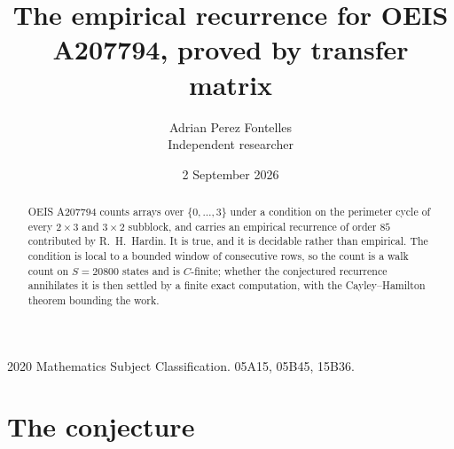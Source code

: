 \documentclass[11pt,a4paper]{article}
\title{The empirical recurrence for OEIS A207794, proved by transfer matrix}
\author{Adrian Perez Fontelles\\ \small Independent researcher}
\date{2 September 2026}
\theoremstyle{plain}
\theoremstyle{definition}
\begin{document}
\maketitle

\begin{abstract}
OEIS A207794 counts arrays over $\{0,\dots,3\}$ under a condition on the perimeter cycle of
every $2\times3$ and $3\times2$ subblock, and carries an empirical recurrence of order $85$ contributed by
R.~H.~Hardin. It is true, and it is decidable rather than empirical. The condition is local to
a bounded window of consecutive rows, so the count is a walk count on $S=20800$ states and is
$C$-finite; whether the conjectured recurrence annihilates it is then settled by a finite exact
computation, with the Cayley--Hamilton theorem bounding the work.
\end{abstract}

\noindent\small 2020 Mathematics Subject Classification. 05A15, 05B45, 15B36.\normalsize

\section{The conjecture}
\end{document}
